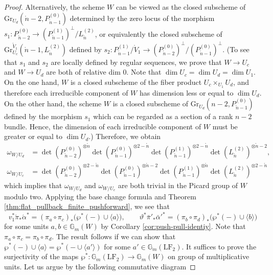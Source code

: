 \documentclass[a4paper]{amsart}
\theoremstyle{plain}
\theoremstyle{definition}
\numberwithin{equation}{section}
\newcommand{\Gr}{\mathrm{Gr}}
\newcommand{\LF}{\mathrm{LF}}
\begin{document}
\begin{proof}
    Alternatively, the scheme $W$ can be viewed as the closed subscheme of $\Gr_{{U}_d}(\mathring{n}-2, P_{\mathring{n}-1}^{(0)})$ determined by the zero locus of the morphism
    $
        s_1:P_{\mathring{n}-2}^{(0)} \to (P_{\mathring{n}-1}^{(1)})^{\perp} / L_{\mathring{n}}^{(2)}
    $, or equivalently the closed subscheme of $\Gr_{{U}_c}^{\mathring{V}_1}(\mathring{n}-1,L_{\mathring{n}}^{(2)})$ defined by
    $
        s_2:P_{\mathring{n}-1}^{(1)}/\mathring{V}_1 \to (P_{\mathring{n}-2}^{(0)})^{\perp} / (P_{\mathring{n}-1}^{(0)})^\perp
    $. (To see that $s_1$ and $s_2$ are locally defined by regular sequences, we prove that $W \to {U}_c$ and $W\to U_d$ are both of relative dim $0$. Note that $\dim {U}_c = \dim {U}_d = \dim U_1$.  On the one hand, $W$ is a closed subscheme of the fiber product ${U}_c \times_{U_1} {U}_d $, and therefore  each irreducible component of $W$ has dimension less or equal to $ \dim {U}_d$. On the other hand, the scheme $W$ is a closed subscheme of $\Gr_{{U}_d}(n-2,P_{\mathring{n}-1}^{(0)})$ defined by the morphism $s_1$ which can be regarded as a section of a rank $n-2$ bundle. Hence, the dimension of each irreducible component of $W$ must be greater or equal to $\dim {U}_d$.) 	Therefore, we obtain
    \begin{align*}
        \omega_{W/{U}_d} & = \det (P_{\mathring{n}-2}^{(0)})^{\otimes \mathring{n}} \det (P_{\mathring{n}-1}^{(0)})^{\otimes 2 - \mathring{n}} \det (P_{\mathring{n}-1}^{(1)})^{\otimes 2 - \mathring{n}} \det (L_{\mathring{n}}^{(2)})^{\otimes \mathring{n}-2},  \\
        \omega_{W/{U}_c} & = \det (P_{\mathring{n}-2}^{(0)})^{\otimes 2 - \mathring{n}} \det (P_{\mathring{n}-1}^{(0)})^{\otimes \mathring{n} - 2} \det (P_{\mathring{n}-1}^{(1)})^{\otimes \mathring{n}} \det (L_{\mathring{n}}^{(2)})^{\otimes 2 - \mathring{n}}
    \end{align*}
    which implies that $\omega_{W/{U}_d} $ and $\omega_{W/{U}_c} $ are both trivial in the Picard group of $W$ modulo two. Applying the base change formula \cite[Theorem 5.2, Corollary 9.13]{huang2023the} and Theorem \ref{thm:flat_pullback_finite_pushforward}, we see that
    \begin{equation}\label{eq:pull-push}
        v_{1}^* \acute{\pi}_* \acute{\alpha}^* =  (\pi_a\circ \pi_{c})_* \big( \wp^*(-) \cup \langle a \rangle \big), \quad  \quad \vartheta^* \bar{\pi}'_* \bar{\alpha}'^{*} = (\pi_b\circ \pi_{d})_* \big( \wp^*(-) \cup \langle b \rangle\big)
    \end{equation}
    for some units $a,b \in \mathbb{G}_m(W) $ by Corollary \ref{cor:push-pull-identiy}. Note that $\pi_a\circ \pi_{c} = \pi_b\circ \pi_{d}$. The result follows if we can show that $\wp^*(-) \cup \langle a \rangle  = \wp^*(- \cup \langle a' \rangle)   $ for some $a' \in \mathbb{G}_m(\LF_2)$. It suffices to prove the surjectivity of the maps $\wp^*: \mathbb{G}_m(\LF_2) \to \mathbb{G}_m(W)$ on group of multiplicative units. Let us argue by the following commutative diagram

\end{proof}
\end{document}
